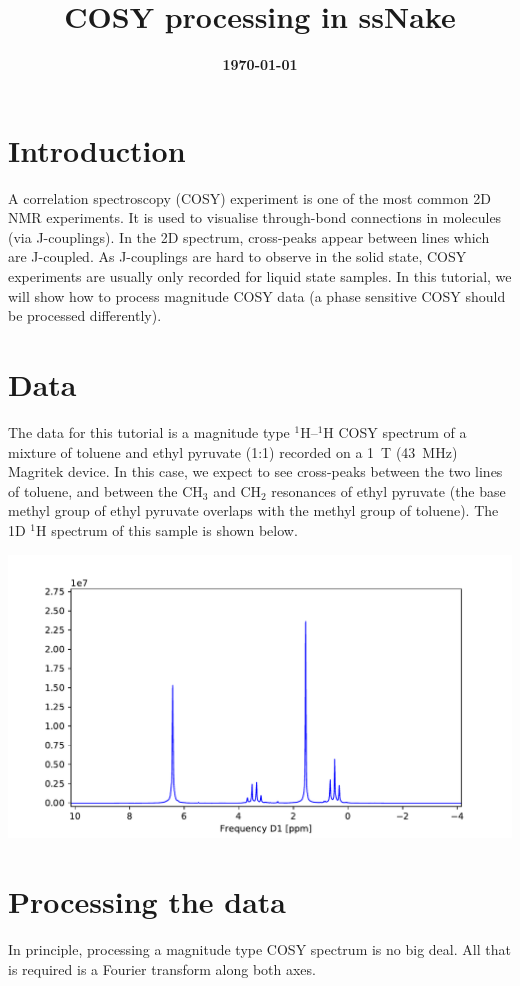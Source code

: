 \documentclass[11pt,a4paper]{article}
\title{\color{black}\fontfamily{SourceSansPro-LF}\bfseries COSY processing in ssNake}
\author{}
\date{\color{black}\fontfamily{SourceSansPro-LF}\bfseries \today}
\begin{document}

\maketitle

\section{Introduction}
A correlation spectroscopy (COSY) experiment is one of the most common 2D NMR experiments. It is
used to visualise through-bond connections in molecules (via J-couplings). In the 2D spectrum,
cross-peaks appear between lines which are J-coupled. As J-couplings are hard to observe in the
solid state, COSY experiments are usually only recorded for liquid state samples. In this tutorial,
we will show how to process magnitude COSY data (a phase sensitive COSY should be processed
differently).



\section{Data}
The data for this tutorial is a magnitude type $^1$H--$^1$H COSY spectrum of a mixture of toluene
and ethyl pyruvate (1:1) recorded on a \SI{1}{\tesla} (\SI{43}{\MHz}) Magritek device. In this case,
we expect to see cross-peaks between the two lines of toluene, and between the CH$_3$ and CH$_2$
resonances of ethyl pyruvate (the base methyl group of ethyl pyruvate overlaps with the methyl
group of toluene). The 1D $^1$H spectrum of this sample is shown below.
\begin{center}
\includegraphics[width=0.8\linewidth]{Figs/1D.pdf}
\end{center}

\section{Processing the data}
In principle, processing a magnitude type COSY spectrum is no big deal. All that is required is a
Fourier transform along both axes.
\end{document}
